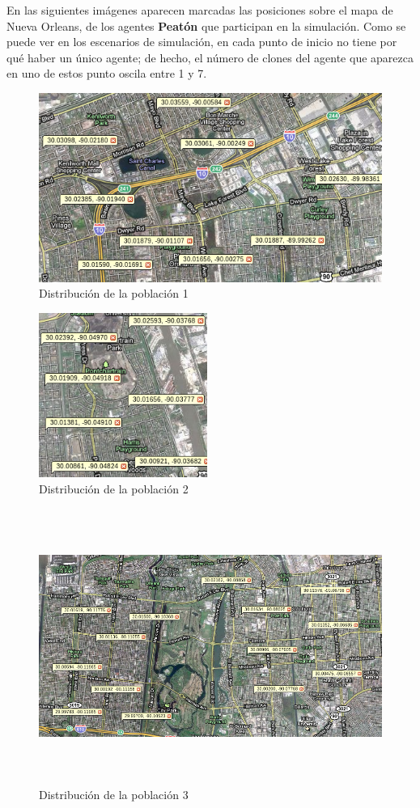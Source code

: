 En las siguientes imágenes aparecen marcadas las posiciones sobre el mapa de
Nueva Orleans, de los agentes {\bf Peatón} que participan en la simulación.
Como se puede ver en los escenarios de simulación, en cada punto de inicio no
tiene por qué haber un único agente; de hecho, el número de clones del agente
que aparezca en uno de estos punto oscila entre 1 y 7.

\begin{figure}[H]
 \centering
 \includegraphics[width=115mm]{figuras/cap6/population.png}
 \caption{Distribución de la población 1}
\end{figure}

\begin{figure}[H]
 \centering
 \includegraphics[width=55mm]{figuras/cap6/populationb.png}
 \caption{Distribución de la población 2}
\end{figure}

\begin{figure}[H]
 \centering
 \includegraphics[height=90mm,angle=90]{figuras/cap6/population1.png}
 \caption{Distribución de la población 3}
\end{figure}

